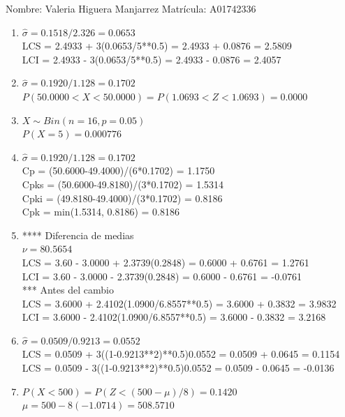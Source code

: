 \documentclass[8pt]{report}
\begin{document}
 \newpage

Nombre: \underline{\hspace*{.2in}}
Valeria Higuera Manjarrez
\underline{\hspace*{.2in}} \quad Matr\'icula:\underline{\hspace*{.2in}}
A01742336
\underline{\hspace*{.2in}} \\

\begin{enumerate}
\item $\hat\sigma = 0.1518/2.326 = 0.0653$\\
LCS = 2.4933 + 3(0.0653/5**0.5) = 2.4933 + 0.0876 = 2.5809\\
LCI = 2.4933 - 3(0.0653/5**0.5) = 2.4933 - 0.0876 = 2.4057
\item $\hat\sigma = 0.1920/1.128 = 0.1702$\\
$P(50.0000 < X < 50.0000) = P(1.0693 < Z < 1.0693) = 0.0000$\\
\item $X \sim Bin(n=16, p=0.05)$\\
$P(X = 5) = 0.000776$
\item $\hat\sigma = 0.1920/1.128 = 0.1702$\\
Cp = (50.6000-49.4000)/(6*0.1702) = 1.1750\\
Cpks = (50.6000-49.8180)/(3*0.1702) = 1.5314\\
Cpki = (49.8180-49.4000)/(3*0.1702) = 0.8186\\
Cpk = min(1.5314, 0.8186) = 0.8186
\item **** Diferencia de medias\\
$\nu = 80.5654$\\
LCS = 3.60 - 3.0000 + 2.3739(0.2848) = 0.6000 + 0.6761 = 1.2761\\
LCI = 3.60 - 3.0000 - 2.3739(0.2848) = 0.6000 - 0.6761 = -0.0761\\
*** Antes del cambio\\
LCS = 3.6000 + 2.4102(1.0900/6.8557**0.5) = 3.6000 + 0.3832 = 3.9832\\
LCI = 3.6000 - 2.4102(1.0900/6.8557**0.5) = 3.6000 - 0.3832 = 3.2168\\
\item $\hat\sigma = 0.0509/0.9213 = 0.0552$\\
LCS = 0.0509 + 3((1-0.9213**2)**0.5)0.0552 = 0.0509 + 0.0645 = 0.1154\\
LCS = 0.0509 - 3((1-0.9213**2)**0.5)0.0552 = 0.0509 - 0.0645 = -0.0136
\item $P(X < 500) = P(Z < (500-\mu)/8) = 0.1420$\\
$\mu = 500 - 8(-1.0714) = 508.5710$\\
\end{enumerate}
\end{document}
